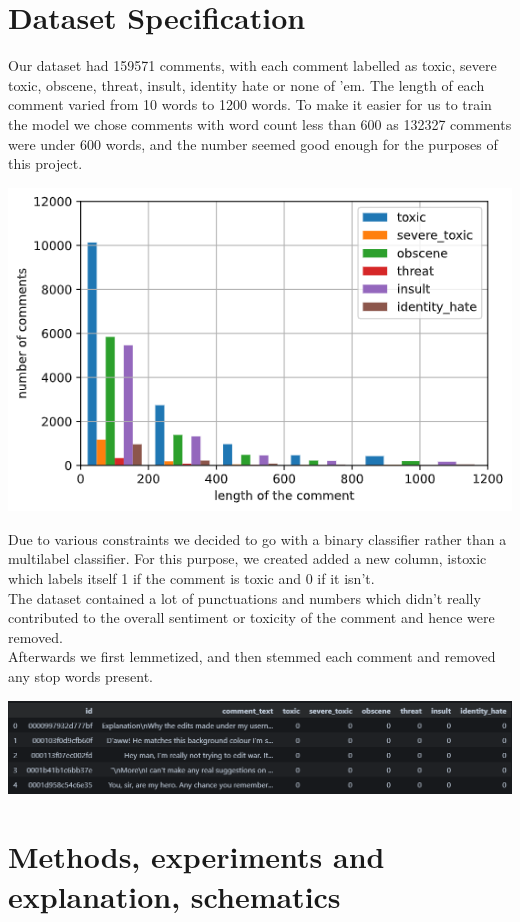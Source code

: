 \documentclass[11pt]{article}
\begin{document}
\section{Dataset Specification}
Our dataset had 159571 comments, with each comment labelled as toxic, severe toxic, obscene, threat, insult, identity hate or none of 'em. The length of each comment varied from 10 words to 1200 words. To make it easier for us to train the model we chose comments with word count less than 600 as 132327 comments were under 600 words, and the number seemed good enough for the purposes of this project.
\begin{center}
	\includegraphics[scale=0.5]{figs/distribution.png}
\end{center}
Due to various constraints we decided to go with a binary classifier rather than a multilabel classifier. For this purpose, we created added a new column, istoxic which labels itself 1 if the comment is toxic and 0 if it isn't.\\
The dataset contained a lot of punctuations and numbers which didn't really contributed to the overall sentiment or toxicity of the comment and hence were removed.\\
Afterwards we first lemmetized, and then stemmed each comment and removed any stop words present. 
\begin{center}
	\includegraphics[scale=0.35]{figs/data_set.png}
\end{center}
\section{Methods, experiments and explanation, schematics}
\end{document}
